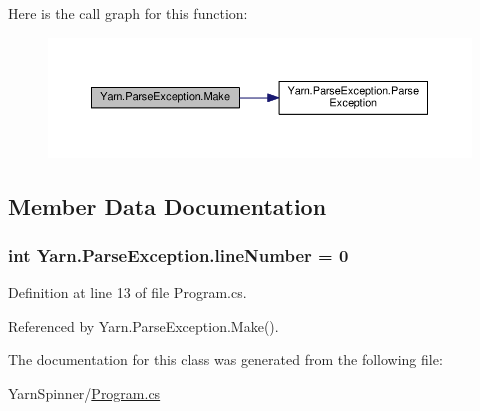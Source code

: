 Here is the call graph for this function\-:
\nopagebreak
\begin{figure}[H]
\begin{center}
\leavevmode
\includegraphics[width=350pt]{a00141_a0265905b09fbd675d40c452d9fc61207_cgraph}
\end{center}
\end{figure}




\subsection{Member Data Documentation}
\hypertarget{a00141_ab335169367e64fd6d89d58b3ac573751}{
\subsubsection[{line\-Number}]{\setlength{\rightskip}{0pt plus 5cm}int Yarn.\-Parse\-Exception.\-line\-Number = 0\hspace{0.3cm}{\ttfamily [package]}}}\label{a00141_ab335169367e64fd6d89d58b3ac573751}


Definition at line 13 of file Program.\-cs.



Referenced by Yarn.\-Parse\-Exception.\-Make().



The documentation for this class was generated from the following file\-:\begin{DoxyCompactItemize}
\item 
Yarn\-Spinner/\hyperlink{a00302}{Program.\-cs}\end{DoxyCompactItemize}
